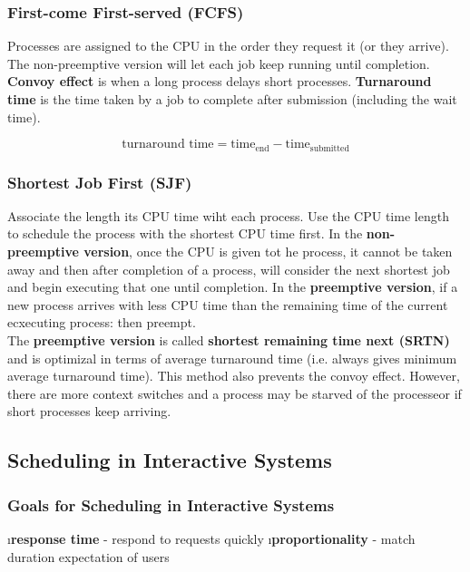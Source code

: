 \documentclass{article}
\begin{document}
    \subsubsection{First-come First-served (FCFS)}

    Processes are assigned to the CPU in the order they request it (or they arrive). The non-preemptive version will let each job keep running until completion. \textbf{Convoy effect} is when a long process delays short processes. \textbf{Turnaround time} is the time taken by a job to complete after submission (including the wait time). 

    $$\textrm{turnaround time} = \textrm{time}_{\textrm{end}} - \textrm{time}_{\textrm{submitted}}$$
    
    \subsubsection{Shortest Job First (SJF)}

    Associate the length its CPU time wiht each process. Use the CPU time length to schedule the process with the shortest CPU time first. In the \textbf{non-preemptive version}, once the CPU is given tot he process, it cannot be taken away and then after completion of a process, will consider the next shortest job and begin executing that one until completion. In the \textbf{preemptive version}, if a new process arrives with less CPU time than the remaining time of the current ecxecuting process: then preempt. \\

    \noindent The \textbf{preemptive version} is called \textbf{shortest remaining time next (SRTN)} and is optimizal in terms of average turnaround time (i.e. always gives minimum average turnaround time). This method also prevents the convoy effect. However, there are more context switches and a process may be starved of the processeor if short processes keep arriving. 

\subsection{Scheduling in Interactive Systems}
    
    \subsubsection{Goals for Scheduling in Interactive Systems}

    \bl
    \i \textbf{response time} - respond to requests quickly
    \i \textbf{proportionality} - match duration expectation of users
    \el
\end{document}

